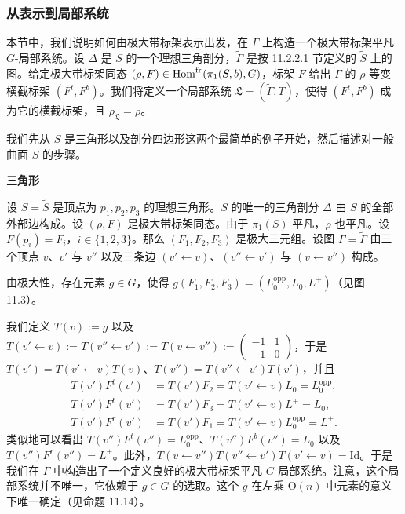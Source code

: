 \subsubsection{从表示到局部系统}

本节中，我们说明如何由极大带标架表示出发，在 $\Gamma$ 上构造一个极大带标架平凡 $G$-局部系统。设 $\Delta$ 是 $S$ 的一个理想三角剖分，$\tilde\Gamma$ 是按 11.2.2.1 节定义的 $\tilde S$ 上的图。给定极大带标架同态 $(\rho,F)\in\operatorname{Hom}^{\mathrm{fr}}_{+}(\pi_1(S,b),G)$，标架 $F$ 给出 $\tilde\Gamma$ 的 $\rho$-等变横截标架 $(F^{t},F^{b})$。我们将定义一个局部系统 $\mathfrak{L}=(\tilde\Gamma,T)$，使得 $(F^{t},F^{b})$ 成为它的横截标架，且 $\rho_{\mathfrak{L}}=\rho$。

我们先从 $S$ 是三角形以及剖分四边形这两个最简单的例子开始，然后描述对一般曲面 $S$ 的步骤。

\textbf{三角形}

设 $S=\tilde S$ 是顶点为 $p_1,p_2,p_3$ 的理想三角形。$S$ 的唯一的三角剖分 $\Delta$ 由 $S$ 的全部外部边构成。设 $(\rho,F)$ 是极大带标架同态。由于 $\pi_1(S)$ 平凡，$\rho$ 也平凡。设 $F(p_i)=F_i$，$i\in\{1,2,3\}$。那么 $(F_1,F_2,F_3)$ 是极大三元组。设图 $\Gamma=\tilde\Gamma$ 由三个顶点 $v$、$v'$ 与 $v''$ 以及三条边 $(v'\leftarrow v)$、$(v''\leftarrow v')$ 与 $(v\leftarrow v'')$ 构成。


由极大性，存在元素 $g\in G$，使得 $g(F_1,F_2,F_3)=(L_0^{\mathrm{opp}},L_0,L^{+})$（见图 11.3）。


我们定义 $T(v):=g$ 以及 $T(v'\leftarrow v):=T(v''\leftarrow v'):=T(v\leftarrow v''):=\begin{pmatrix} -1 & 1\\ -1 & 0\end{pmatrix}$，于是 $T(v')=T(v'\leftarrow v)T(v)$、$T(v'')=T(v''\leftarrow v')T(v')$，并且
\begin{align*}
T(v')F^{t}(v')&=T(v')F_2=T(v'\leftarrow v)L_0=L_0^{\mathrm{opp}},\\
T(v')F^{b}(v')&=T(v')F_3=T(v'\leftarrow v)L^{+}=L_0,\\
T(v')F^{r}(v')&=T(v')F_1=T(v'\leftarrow v)L_0^{\mathrm{opp}}=L^{+}.
\end{align*}
类似地可以看出 $T(v'')F^{t}(v'')=L_0^{\mathrm{opp}}$、$T(v'')F^{b}(v'')=L_0$ 以及 $T(v'')F^{r}(v'')=L^{+}$。此外，$T(v\leftarrow v'')T(v''\leftarrow v')T(v'\leftarrow v)=\mathrm{Id}$。于是我们在 $\Gamma$ 中构造出了一个定义良好的极大带标架平凡 $G$-局部系统。注意，这个局部系统并不唯一，它依赖于 $g\in G$ 的选取。这个 $g$ 在左乘 $\mathrm{O}(n)$ 中元素的意义下唯一确定（见命题 11.14）。

